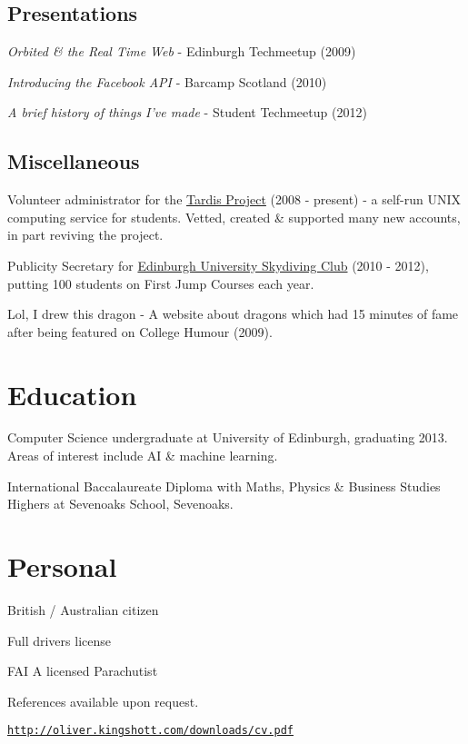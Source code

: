 \documentclass[a4paper]{article}
\def\footerlink{http://oliver.kingshott.com/downloads/cv.pdf}
\renewenvironment{itemize}{
  \begin{list}{}{
    \setlength{\leftmargin}{1.5em}
  }
}{
  \end{list}
}
\begin{document}
\subsection*{Presentations}
\begin{itemize}
\item \emph{Orbited \& the Real Time Web} - Edinburgh Techmeetup (2009)
\item \emph{Introducing the Facebook API} - Barcamp Scotland (2010)
\item \emph{A brief history of things I've made} - Student Techmeetup (2012)
\end{itemize}

\subsection*{Miscellaneous}
\begin{itemize}
\item Volunteer administrator for the \href{http://www.tardis.ed.ac.uk/}{Tardis Project} (2008 - present) - a self-run UNIX computing service for students. Vetted, created \& supported many new accounts, in part reviving the project.
\item Publicity Secretary for \href{http://facebook.com/getjumped/}{Edinburgh University Skydiving Club} (2010 - 2012), putting 100 students on First Jump Courses each year.
\item Lol, I drew this dragon - A website about dragons which had 15 minutes of fame after being featured on College Humour (2009).
\end{itemize}

\section*{Education}
\begin{itemize}
  \item Computer Science undergraduate at University of Edinburgh, graduating 2013. Areas of interest include AI \& machine learning.
  \item International Baccalaureate Diploma with Maths, Physics \& Business Studies Highers at Sevenoaks School, Sevenoaks.
\end{itemize}

\section*{Personal}

\begin{itemize}
\item British / Australian citizen
\item Full drivers license
\item FAI A licensed Parachutist
\item References available upon request.
\end{itemize}

\bigskip

\begin{center}
  \begin{footnotesize}
    \href{\footerlink}{\texttt{\footerlink}}
  \end{footnotesize}
\end{center}
\end{document}
